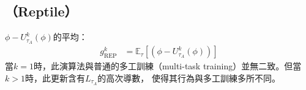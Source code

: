 \subsection{\reptile （Reptile）}
$\phi - U_{\tau_{A}}^{k}(\phi)$的平均：
\begin{align}
    g_{\mathrm{REP}}^{k} &= \mathbb{E}_{\tau}\left[ \left( \phi - U_{\tau_{A}}^{k}(\phi) \right) \right]
\end{align}
當$k = 1$時，此演算法與普通的多工訓練（multi-task training）並無二致。但當$k > 1$時，此更新含有$L_{\tau_{A}}$的高次導數，
使得其行為與多工訓練多所不同。

\iffalse
\section{模型內插法（Model Interpolation）}

雖然類神經網路在影像、語言及語音均取得巨大的成功，優化過後的網路其內部運作機制卻宛如黑箱般難以被解釋。
這樣的現象可能阻礙類神經網路的發展，因為研究者無法透過分析模型的運作機制來改進模型架構；
因此許多研究者開始發展分析類神經網路的方法，
而模型內插法為其中一種分析模型的技巧，初見於2015年谷氏等人\cite{Goodfellow2015QualitativelyCN}對類神經網路的分析。
模型內插法直接在有興趣的模型之間（或附近）可視化一般認為極度非convex（highly non-convex）的損失平面。

\subsection{線性內插（Linear Interpolation，Lerp）}
給定有興趣分析的兩個模型及其參數$\phi_{1}$、$\phi_{2}$，線性內插法直接在通過這兩個參數的射線上計算在該點的損失：
\begin{equation}
    \mathbf{Lerp} \left( \phi_{1}, \phi_{2} ; \alpha \right) = \alpha \phi_{1} + (1 - \alpha) \phi_{2},\ \alpha \in \mathbb{R}.
\end{equation}
\subsection{球面線性內插（Spherical Linear Interpolation，Slerp）}
給定有興趣分析的兩個模型及其參數$\phi_{1}$、$\phi_{2}$，球面線性內插法可以被視為線性內插法的球面版本：
\begin{align}
    \mathbf{Slerp} \left( \phi_{1}, \phi_{2} ; \alpha \right) &= \frac{\sin [\alpha\Omega]}{\sin \Omega} \phi_{1} + \frac{\sin [(1-\alpha) \Omega]}{\sin \Omega} \phi_{2},\ \alpha \in \mathbb{R}. \\
    \Omega &= \cos^{-1} \left( \frac{\phi_{1} \cdot \phi_{2}}{ \left\lVert \phi_{1} \right\rVert \cdot \left\lVert \phi_{2} \right\rVert} \right)
\end{align}
\fi